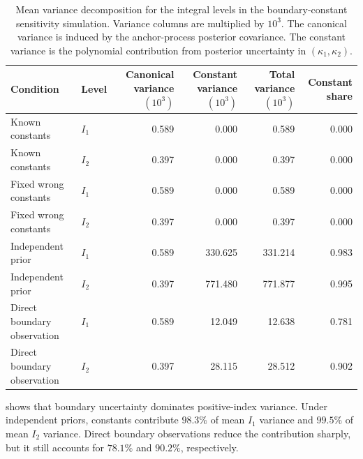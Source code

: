 \documentclass[11pt,a4paper]{article}
\theoremstyle{definition}
\theoremstyle{remark}
\begin{document}
\begin{table}[htbp]
\centering
\caption{\label{tab:boundary-constant-variance-decomposition}Mean variance decomposition for the integral levels in the boundary-constant sensitivity simulation. Variance columns are multiplied by \(10^3\). The canonical variance is induced by the anchor-process posterior covariance. The constant variance is the polynomial contribution from posterior uncertainty in \((\kappa_1,\kappa_2)\).}
\begin{tabular}{llrrrr}
Condition & Level & Canonical variance \((10^3)\) & Constant variance \((10^3)\) & Total variance \((10^3)\) & Constant share \\
\midrule
Known constants & \(I_1\) & 0.589 & 0.000 & 0.589 & 0.000 \\
Known constants & \(I_2\) & 0.397 & 0.000 & 0.397 & 0.000 \\
Fixed wrong constants & \(I_1\) & 0.589 & 0.000 & 0.589 & 0.000 \\
Fixed wrong constants & \(I_2\) & 0.397 & 0.000 & 0.397 & 0.000 \\
Independent prior & \(I_1\) & 0.589 & 330.625 & 331.214 & 0.983 \\
Independent prior & \(I_2\) & 0.397 & 771.480 & 771.877 & 0.995 \\
Direct boundary observation & \(I_1\) & 0.589 & 12.049 & 12.638 & 0.781 \\
Direct boundary observation & \(I_2\) & 0.397 & 28.115 & 28.512 & 0.902 \\
\end{tabular}

\end{table}

 shows that boundary uncertainty dominates positive-index variance. Under independent priors, constants contribute \(98.3\%\) of mean \(I_1\) variance and \(99.5\%\) of mean \(I_2\) variance. Direct boundary observations reduce the contribution sharply, but it still accounts for \(78.1\%\) and \(90.2\%\), respectively.
\end{document}
